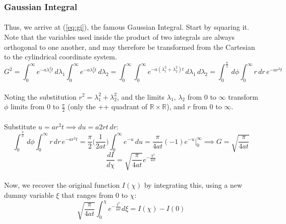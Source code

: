 \subsubsection*{Gaussian Integral}
\paragraph{}
Thus, we arrive at (\ref{eq:gi}), the famous Gaussian Integral. Start by squaring it. Note that the variables used inside the product of two integrals are always orthogonal to one another, and may therefore be transformed from the Cartesian to the cylindrical coordinate system.
\begin{equation*}
G^2=\int_0^{\infty} e^{-a\lambda_1^2t}\,d\lambda_1 \int_0^{\infty} e^{-a\lambda_2^2t}\,d\lambda_2 =\int_0^{\infty}  \int_0^{\infty} e^{-a(\lambda_1^2 + \lambda_2^2)t}\,d\lambda_1\,d\lambda_2 = \int_0^{\frac{\pi}{2}}\,d\phi \int_0^{\infty} r\,dr\,e^{-ar^2t}
\end{equation*}
\paragraph{}
Noting the substitution $r^2 = \lambda_1^2 + \lambda_2^2$, and the limits $\lambda_1$, $\lambda_2$ from 0 to $\infty$ transform $\phi$ limits from 0 to $\frac{\pi}{2}$ (only the ++ quadrant of $\mathbb{R} \times \mathbb{R} $), and $r$ from 0 to $\infty$. 
\paragraph{}
Substitute $u=ar^2t\implies du=a2rt\,dr$:
\begin{equation*}
\int_0^{\frac{\pi}{2}}\,d\phi \int_0^{\infty} r\,dr\,e^{-ar^2t} = \frac{\pi}{2}\big(\frac{1}{2at}\big)\int_0^{\infty}e^{-u}\,du=\frac{\pi}{4at}(-1)\left.e^{-u}\right|_0^{\infty} \implies G=\sqrt{\frac{\pi}{4at}}
\end{equation*}
\begin{equation*}
\frac{dI}{d\chi} = \sqrt{\frac{\pi}{4at}} e^{-\frac{\chi^2}{4 a t}}
\end{equation*}
\paragraph{}
Now, we recover the original function $I(\chi)$ by integrating this, using a new dummy variable $\xi$ that ranges from $0$ to $\chi$:
\begin{equation}
\label{eq:ichi2}
\sqrt{\frac{\pi}{4at}} \int_{0}^{\chi} {e^{-\frac{\xi^2}{4 a t}}} d\xi = I(\chi) - I(0)
\end{equation}
